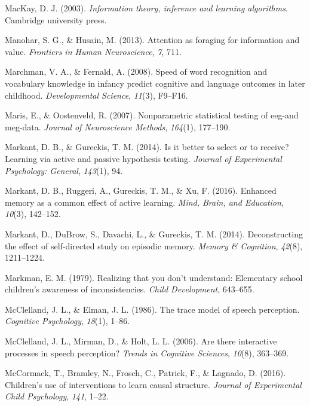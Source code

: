 \documentclass[oneside]{report}
\begin{document}
\hypertarget{ref-mackay2003information}{}
MacKay, D. J. (2003). \emph{Information theory, inference and learning
algorithms}. Cambridge university press.

\hypertarget{ref-manohar2013attention}{}
Manohar, S. G., \& Husain, M. (2013). Attention as foraging for
information and value. \emph{Frontiers in Human Neuroscience}, \emph{7},
711.

\hypertarget{ref-marchman2008speed}{}
Marchman, V. A., \& Fernald, A. (2008). Speed of word recognition and
vocabulary knowledge in infancy predict cognitive and language outcomes
in later childhood. \emph{Developmental Science}, \emph{11}(3), F9--F16.

\hypertarget{ref-maris2007nonparametric}{}
Maris, E., \& Oostenveld, R. (2007). Nonparametric statistical testing
of eeg-and meg-data. \emph{Journal of Neuroscience Methods},
\emph{164}(1), 177--190.

\hypertarget{ref-markant2014better}{}
Markant, D. B., \& Gureckis, T. M. (2014). Is it better to select or to
receive? Learning via active and passive hypothesis testing.
\emph{Journal of Experimental Psychology: General}, \emph{143}(1), 94.

\hypertarget{ref-markant2016enhanced}{}
Markant, D. B., Ruggeri, A., Gureckis, T. M., \& Xu, F. (2016). Enhanced
memory as a common effect of active learning. \emph{Mind, Brain, and
Education}, \emph{10}(3), 142--152.

\hypertarget{ref-markant2014deconstructing}{}
Markant, D., DuBrow, S., Davachi, L., \& Gureckis, T. M. (2014).
Deconstructing the effect of self-directed study on episodic memory.
\emph{Memory \& Cognition}, \emph{42}(8), 1211--1224.

\hypertarget{ref-markman1979realizing}{}
Markman, E. M. (1979). Realizing that you don't understand: Elementary
school children's awareness of inconsistencies. \emph{Child
Development}, 643--655.

\hypertarget{ref-mcclelland1986trace}{}
McClelland, J. L., \& Elman, J. L. (1986). The trace model of speech
perception. \emph{Cognitive Psychology}, \emph{18}(1), 1--86.

\hypertarget{ref-mcclelland2006there}{}
McClelland, J. L., Mirman, D., \& Holt, L. L. (2006). Are there
interactive processes in speech perception? \emph{Trends in Cognitive
Sciences}, \emph{10}(8), 363--369.

\hypertarget{ref-mccormack2016children}{}
McCormack, T., Bramley, N., Frosch, C., Patrick, F., \& Lagnado, D.
(2016). Children's use of interventions to learn causal structure.
\emph{Journal of Experimental Child Psychology}, \emph{141}, 1--22.
\end{document}
